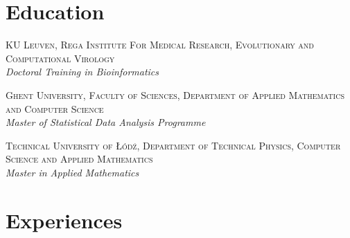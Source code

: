 \documentclass[a4paper, oneside, final]{scrartcl}
\newenvironment{lyxlist}[1]
{\begin{list}{}
{\settowidth{\labelwidth}{#1}
 \setlength{\leftmargin}{\labelwidth}
 \addtolength{\leftmargin}{\labelsep}
 \renewcommand{\makelabel}[1]{##1\hfil}}}
{\end{list}}
\newcommand{\noun}[1]{\textsc{#1}}
\begin{document}
    \begin{center}
     
     \section{Education}

\begin{lyxlist}{00.00.0000}
\item [{\noun{\scriptsize 2011 - 2015}}] \noun{KU Leuven,
Rega Institute For Medical Research, Evolutionary and Computational Virology }\\
\emph{Doctoral Training in Bioinformatics} 
\item [{\noun{\scriptsize 2009-2010}}] \noun{Ghent University, Faculty
of Sciences, Department of Applied Mathematics and Computer Science}\\
\emph{Master of Statistical Data Analysis Programme}
\item [{\noun{\scriptsize 2005-2010}}] \noun{Technical University of \L{}ód\'{z},
Department of Technical Physics, Computer Science and Applied Mathematics}\\
\emph{Master in Applied Mathematics}
\end{lyxlist}  
     
\section{Experiences}
\vspace{-8pt}
 
\begin{tabularx}{0.97\linewidth}{>{\raggedleft\scshape}p{2cm}X}


\end{tabularx}
\end{center}
\end{document}
